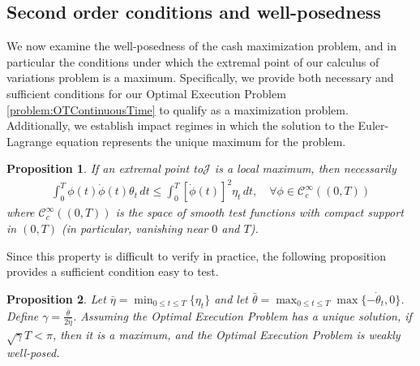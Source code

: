 \documentclass[final,3p,authoryear,12pt]{elsarticle}
\newtheorem{proposition}{Proposition}
\begin{document}
\subsection{Second order conditions and well-posedness}\label{subsection:CT_second_order}

We now examine the well-posedness of the cash maximization problem, and in particular the conditions under which the extremal point of our calculus of variations problem is a maximum. Specifically, we provide both necessary and sufficient conditions for our Optimal Execution Problem \eqref{problem:OTContinuousTime} to qualify as a maximization problem. Additionally, we establish impact regimes in which the solution to the Euler-Lagrange equation represents the unique maximum for the problem.



\begin{proposition}
\label{proposition:loclaminimumCalculusofVariations}
    If an extremal point to$\mathcal{J}$ is a local maximum, then necessarily
    \begin{eqnarray}\label{inequality:localminimumCalculusofVariations_ineq}
        \int_{0}^{T}\phi(t)\dot{\phi}(t)\theta_{t}\,dt \le \int_{0}^{T}[\dot{\phi}(t)]^{2}\eta_{t}\,dt,
\quad \forall \phi \in \mathcal{C}^{\infty}_{c}((0,T))
    \end{eqnarray}
    where $\mathcal{C}^{\infty}_{c}((0,T))$ is the space of smooth test
    functions with compact support in $(0,T)$ (in particular, vanishing near
    $0$ and $T$).
\end{proposition}

Since this property is difficult to verify in practice, the following proposition provides a sufficient condition easy to test.

 
\begin{proposition}
\label{proposition:CT_is_well_defined}
    Let $\bar{\eta}=\min_{0 \le t \le T} \{ \eta_{t} \}$ and let
    $\bar{\theta}=\max_{0 \le t \le T}\max\{-\dot \theta_{t},0\}$. Define
    $\gamma=\frac{\bar{\theta}}{2\bar{\eta}}$. Assuming the Optimal Execution
    Problem has a unique solution, if $\sqrt{\gamma}T < \pi$, then it is a
    maximum, and the Optimal Execution Problem is weakly well-posed. 
\end{proposition}
\end{document}
